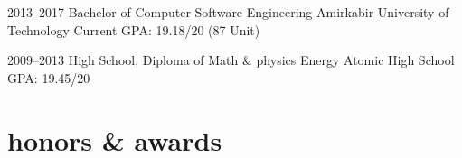 \documentclass[]{friggeri-cv} %
\begin{document}
\begin{entrylist}


\entry
{2013--2017}
{Bachelor {\normalfont of Computer Software Engineering}}
{Amirkabir University of Technology}
{Current GPA: 19.18/20 (87 Unit)}


\entry
{2009--2013}
{High School, {\normalfont Diploma of Math \& physics}}
{Energy Atomic High School}
{GPA: 19.45/20}



\end{entrylist}


\section{honors \& awards}
\end{document}
